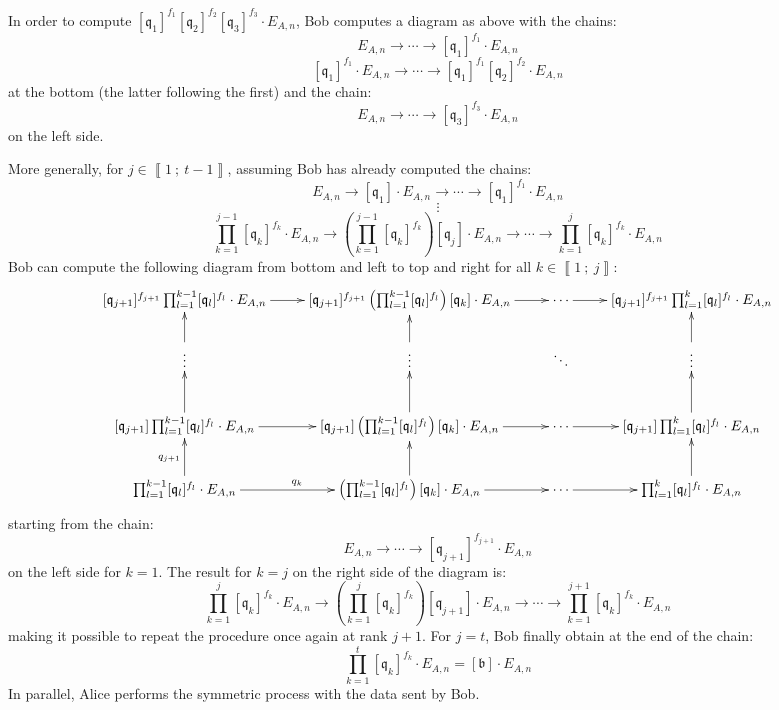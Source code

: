 \documentclass[a4paper,10pt]{report}
\theoremstyle{definition}
\theoremstyle{plain}
\theoremstyle{definition}
\renewcommand{\i}[2]{\left\llbracket #1~;~#2\right\rrbracket}
\renewcommand{\(}{\left(}
\renewcommand{\)}{\right)}
\newcommand{\mf}[1]{\mathfrak{#1}}
\newcommand{\mfq}{\mathfrak{q}}
\begin{document}
In order to compute $[\mf{q}_1]^{f_1}[\mf{q}_2]^{f_2}[\mf{q}_3]^{f_3}\cdot E_{A,n}$, Bob computes a diagram as above with the chains:
\[E_{A,n}\longrightarrow \cdots\longrightarrow [\mfq_1]^{f_1}\cdot E_{A,n}\]
\[[\mfq_1]^{f_1}\cdot E_{A,n}\longrightarrow \cdots\longrightarrow [\mfq_1]^{f_1}[\mf{q}_2]^{f_2}\cdot E_{A,n}\]
at the bottom (the latter following the first) and the chain:
\[E_{A,n}\longrightarrow \cdots\longrightarrow [\mfq_3]^{f_3}\cdot E_{A,n}\]
on the left side.

More generally, for $j\in\i{1}{t-1}$, assuming Bob has already computed the chains:
\[E_{A,n}\longrightarrow [\mf{q}_1]\cdot E_{A,n} \longrightarrow \cdots\longrightarrow [\mfq_1]^{f_1}\cdot E_{A,n}\]
\[\vdots\]
\[\prod_{k=1}^{j-1} [\mfq_k]^{f_k}\cdot E_{A,n}\longrightarrow \(\prod_{k=1}^{j-1} [\mfq_k]^{f_k}\)[\mf{q}_j]\cdot E_{A,n}\longrightarrow \cdots\longrightarrow \prod_{k=1}^{j} [\mfq_k]^{f_k}\cdot E_{A,n}\]
Bob can compute the following diagram from bottom and left to top and right for all $k\in\i{1}{j}$:
\[\xymatrix{
[\mf{q}_{j+1}]^{f_{j+1}}\prod_{l=1}^{k-1} [\mfq_l]^{f_l} \cdot E_{A,n} \ar[r] & [\mf{q}_{j+1}]^{f_{j+1}}\(\prod_{l=1}^{k-1} [\mfq_l]^{f_l}\)[\mf{q}_{k}] \cdot E_{A,n}  \ar[r] & \cdots \ar[r] & [\mf{q}_{j+1}]^{f_{j+1}}\prod_{l=1}^{k} [\mfq_l]^{f_l} \cdot E_{A,n} \\
\vdots \ar[u] & \vdots \ar[u] & \ddots & \vdots \ar[u] \\
[\mf{q}_{j+1}]\prod_{l=1}^{k-1} [\mfq_l]^{f_l} \cdot E_{A,n} \ar[u] \ar[r] & [\mf{q}_{j+1}]\(\prod_{l=1}^{k-1} [\mfq_l]^{f_l}\)[\mf{q}_{k}] \cdot E_{A,n} \ar[u] \ar[r] & \cdots \ar[r] & [\mf{q}_{j+1}]\prod_{l=1}^{k} [\mfq_l]^{f_l} \cdot E_{A,n} \ar[u]\\
\prod_{l=1}^{k-1} [\mfq_l]^{f_l} \cdot E_{A,n} \ar[u]^{q_{j+1}} \ar[r]^{q_k} & \(\prod_{l=1}^{k-1} [\mfq_l]^{f_l}\)[\mf{q}_k] \cdot E_{A,n} \ar[u] \ar[r] & \cdots \ar[r] & \prod_{l=1}^{k} [\mfq_l]^{f_l} \cdot E_{A,n} \ar[u]
}\]
starting from the chain:
\[E_{A,n}\longrightarrow \cdots\longrightarrow [\mfq_{j+1}]^{f_{j+1}}\cdot E_{A,n}\]
on the left side for $k=1$. The result for $k=j$ on the right side of the diagram is:
\[\prod_{k=1}^{j} [\mfq_k]^{f_k}\cdot E_{A,n}\longrightarrow \(\prod_{k=1}^{j} [\mfq_k]^{f_k}\)[\mf{q}_{j+1}]\cdot E_{A,n}\longrightarrow \cdots\longrightarrow \prod_{k=1}^{j+1} [\mfq_k]^{f_k}\cdot E_{A,n}\]
making it possible to repeat the procedure once again at rank $j+1$. For $j=t$, Bob finally obtain at the end of the chain:
\[\prod_{k=1}^{t} [\mfq_k]^{f_k}\cdot E_{A,n}=[\mf{b}]\cdot E_{A,n}\]
In parallel, Alice performs the symmetric process with the data sent by Bob.
\end{document}
